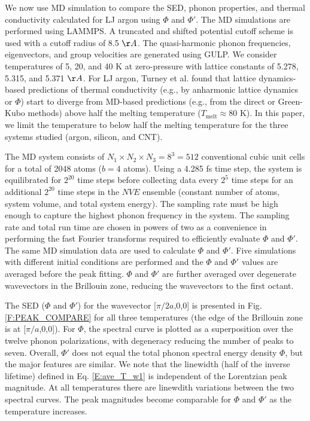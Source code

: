 \documentclass[12pt,twocolumn,iop]{/usr/share/texmf-texlive/tex/latex/iop/iopart}[/usr/share/texmf-texlive/tex/latex/iop/]
\begin{document}
We now use MD simulation to compare the SED, phonon properties, and thermal conductivity calculated for LJ argon using $\Phi$ and $\Phi'$. The MD simulations are performed using LAMMPS.\cite{LAMMPS} A truncated and shifted
potential cutoff scheme is used with a cutoff radius of 8.5 $\AA$. The quasi-harmonic phonon frequencies, eigenvectors, and group velocities are generated using GULP.\cite{GULP} We consider temperatures of 5, 20, and 40 K at zero-pressure with lattice constants of 5.278, 5.315, and 5.371 $\AA$. For LJ argon, Turney et al. found that lattice dynamics-based predictions of thermal conductivity (e.g., by anharmonic lattice dynamics or $\Phi$) start to diverge from MD-based predictions (e.g., from the direct or Green-Kubo methods) above half the melting temperature ($T_{\mathrm{melt}} \approx 80$ K).\cite{turney2009a} In this paper, we limit the temperature to below half the melting temperature for the three systems studied (argon, silicon, and CNT).

The MD system consists of $N_1 \times N_2 \times N_3 = 8^3 = 512$ conventional cubic unit cells for a total of 2048 atoms ($b=4$ atoms). Using a 4.285 fs time step, the system is equilibrated for $2^{20}$ time steps before collecting data every $2^5$ time steps for an additional $2^{20}$ time steps in the $NVE$ ensemble (constant number of atoms, system volume, and total system energy).\cite{mcquarrie2000} The sampling rate must be high enough to capture the highest phonon frequency in the system. The sampling rate and total run time are chosen in powers of two as a convenience in performing the fast Fourier transforms required to efficiently evaluate $\Phi$ and $\Phi'$. The same MD simulation data are used to calculate $\Phi$ and $\Phi'$.  Five simulations with different initial conditions are performed and the $\Phi$ and $\Phi'$ values are averaged before the peak fitting. $\Phi$ and $\Phi'$ are further averaged over degenerate wavevectors in the Brillouin zone, reducing the wavevectors to the first octant.\cite{mcgaugheythesis}

The SED ($\Phi$ and $\Phi'$) for the wavevector [$\pi/2a$,0,0] is presented in Fig$.$ \ref{F:PEAK_COMPARE} for all three temperatures (the edge of the Brillouin zone is at [$\pi/a$,0,0]).  For $\Phi$, the spectral curve is plotted as a superposition over the twelve phonon polarizations, with degeneracy reducing the number of peaks to seven.  Overall, $\Phi'$ does not equal the total phonon spectral energy density $\Phi$, but the major features are similar. We note that the linewidth (half of the inverse lifetime) defined in Eq$.$ \eqref{E:ave_T_w1} is independent of the Lorentzian peak magnitude. At all temperatures there are linewdith variations between the two spectral curves. The peak magnitudes become comparable for $\Phi$ and $\Phi'$ as the temperature increases.
\end{document}
